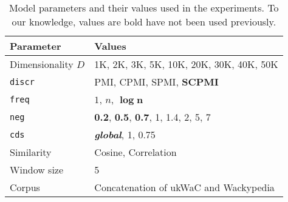 \begin{table}
  \centering
  \begin{tabular}{ll}
    \toprule
    Parameter & Values \\
    \midrule
    Dimensionality $D$ & 1K, 2K, 3K, 5K, 10K, 20K, 30K, 40K, 50K \\
    \texttt{discr} & PMI, CPMI, SPMI, \textbf{SCPMI} \\
    \texttt{freq} & $1$, $n$, $\boldsymbol{\log n}$ \\
    \texttt{neg} & \textbf{0.2}, \textbf{0.5}, \textbf{0.7}, 1, 1.4, 2, 5, 7 \\
    \texttt{cds} & \textbf{\textit{global}}, 1, 0.75 \\
    Similarity & Cosine, Correlation \\
    Window size & 5                                \\
    Corpus & Concatenation of ukWaC and Wackypedia \\
    \bottomrule
  \end{tabular}
  \caption{Model parameters and their values used in the experiments. To our knowledge, values are bold have not been used previously.}
\label{tab:parameters}
\end{table}

